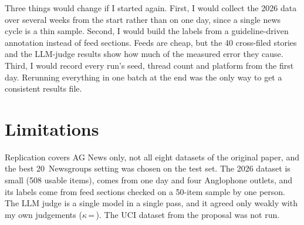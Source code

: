\documentclass[11pt]{article}
\begin{document}
Three things would change if I started again. First, I would collect the 2026 data over
several weeks from the start rather than on one day, since a single news cycle is a thin
sample. Second, I would build the labels from a guideline-driven annotation instead of
feed sections. Feeds are cheap, but the 40 cross-filed stories and the LLM-judge results
show how much of the measured error they cause. Third, I would record every run's seed,
thread count and platform from the first day. Rerunning everything in one batch at the end
was the only way to get a consistent results file.

\section*{Limitations}
Replication covers AG News only, not all eight datasets of the original paper, and the
best 20~Newsgroups setting was chosen on the test set. The 2026
dataset is small (508 usable items), comes from one day and four Anglophone outlets, and
its labels come from feed sections checked on a 50-item sample by one person. The LLM judge
is a single model in a single pass, and it agreed only weakly with my own judgements
($\kappa$\,=\,\HumanKappa). The UCI dataset from the proposal was not run.


\end{document}
